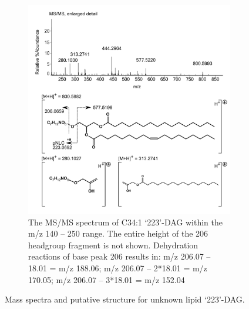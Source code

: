 \begin{figure}[h] \ContinuedFloat
    \begin{subfigure}[b]{1\linewidth}
       \includegraphics[width=\linewidth]{figs_app1/223-DAG_2}
       \caption{The MS/MS spectrum of C34:1 ‘223’-DAG within the m/z 140 – 250 range. The entire height of the 206 headgroup fragment is not shown. Dehydration reactions of base peak 206 results in: m/z 206.07 – 18.01 = m/z 188.06; m/z 206.07 – 2*18.01 = m/z 170.05; m/z 206.07 – 3*18.01 = m/z 152.04}
        \label{fig:223-DAG-structure}
    \end{subfigure}
\caption{Mass spectra and putative structure for unknown lipid `223'-DAG.}
\label{fig:223-DAG}
\end{figure}

